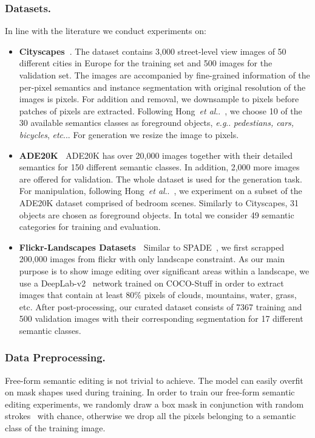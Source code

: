 \documentclass[runningheads]{llncs}
\makeatletter
\DeclareRobustCommand\onedot{\futurelet\@let@token\@onedot}
\def\@onedot{\ifx\@let@token.\else.\null\fi\xspace}
\def\eg{\emph{e.g}\onedot} \def\Eg{\emph{E.g}\onedot}
\def\etc{\emph{etc}\onedot} \def\vs{\emph{vs}\onedot}
\def\etal{\emph{et al}\onedot}
\def\hong{Hong~\etal~\cite{hong2018learning}}
\makeatother
\begin{document}
\subsubsection{Datasets.} In line with the literature we conduct experiments on:
\begin{itemize}
    \item\textbf{Cityscapes~\cite{Cordts_2016_CVPR}}. The dataset contains 3,000 street-level view images of 50 different cities in Europe for the training set and 500 images for the validation set. The images are accompanied by fine-grained information of the per-pixel semantics and instance segmentation with original resolution of the images is  pixels. For addition and removal, we downsample to  pixels before patches of  pixels are extracted.
    Following \hong{}, we choose 10 of the 30 available semantics classes as foreground objects, \eg{} \textit{pedestians, cars, bicycles}, \etc{}.
    For generation we resize the image to  pixels.


    \item\textbf{ADE20K~\cite{zhou2016semantic,zhou2017scene}}
    \label{ssc:ADE20K}
    ADE20K has over 20,000 images together with their detailed semantics for 150 different semantic classes.
    In addition, 2,000 more images are offered for validation.
    The whole dataset is used for the generation task.
	For manipulation, following Hong~\etal~\cite{hong2018learning}, we experiment on a subset of the ADE20K dataset comprised of bedroom scenes.
	Similarly to Cityscapes, 31 objects are chosen as foreground objects. In total we consider 49 semantic categories for training and evaluation. 

    \item\textbf{Flickr-Landscapes Datasets~\cite{park2019SPADE}}
    \label{ssc:Flickr}
    Similar to SPADE~\cite{park2019SPADE}, we first scrapped 200,000 images from flickr with only landscape constraint. As our main purpose is to show image editing over significant areas within a landscape, we use a DeepLab-v2~\cite{chen2017deeplabv2} network trained on COCO-Stuff in order to extract images that contain at least 80\% pixels of clouds, mountains, water, grass, etc. After post-processing, our curated dataset consists of 7367 training and 500 validation images with their corresponding segmentation for 17 different semantic classes. 
\end{itemize}

\subsubsection{Data Preprocessing.}
Free-form semantic editing is not trivial to achieve.
The model can easily overfit on mask shapes used during training.
In order to train our free-form semantic editing experiments, we randomly draw a box mask in conjunction with random strokes~\cite{yu2018free} with  chance, otherwise we drop all the pixels belonging to a semantic class of the training image.
   
\end{document}

